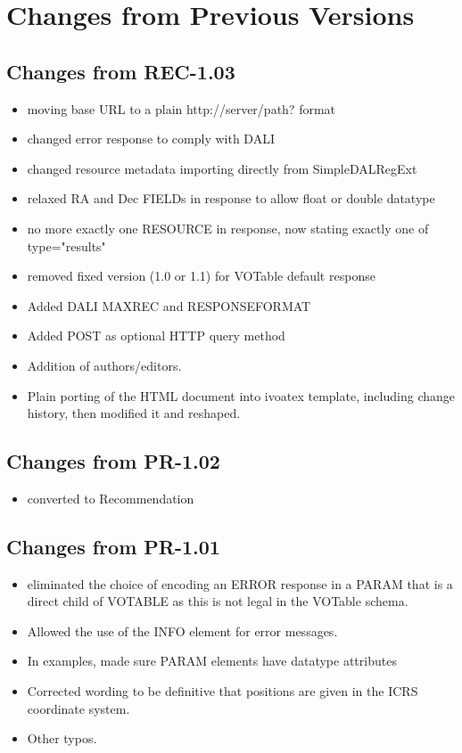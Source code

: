 \documentclass[11pt,a4paper]{ivoa}
\begin{document}
\section{Changes from Previous Versions}
\label{app:changes}

\subsection{Changes from REC-1.03}
\begin{itemize}[noitemsep]
	\item moving base URL to a plain http://server/path? format
	\item changed error response to comply with DALI
	\item changed resource metadata importing directly from SimpleDALRegExt
	\item relaxed RA and Dec FIELDs in response to allow float or double datatype
	\item no more exactly one RESOURCE in response, now stating exactly one of type="results"
	\item removed fixed version (1.0 or 1.1) for VOTable default response
	\item Added DALI MAXREC and RESPONSEFORMAT
	\item Added POST as optional HTTP query method
	\item Addition of authors/editors.
	\item Plain porting of the HTML document into ivoatex template, including change history, then modified it and reshaped.
\end{itemize}

\subsection{Changes from PR-1.02}
\begin{itemize}[noitemsep]
	\item converted to Recommendation
\end{itemize}

\subsection{Changes from PR-1.01}
\begin{itemize}[noitemsep]
	\item eliminated the choice of encoding an ERROR response in a PARAM that is a direct child of VOTABLE as this is not legal in the VOTable schema.
	\item Allowed the use of the INFO element for error messages.
	\item In examples, made sure PARAM elements have datatype attributes
	\item Corrected wording to be definitive that positions are given in the ICRS coordinate system.
	\item Other typos.
\end{itemize}
\end{document}
